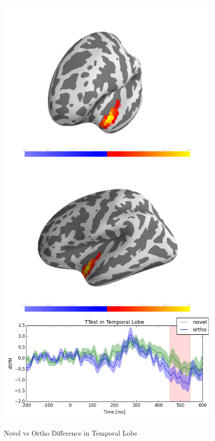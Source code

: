 \documentclass{frontiersSCNS}
\begin{document}
\begin{figure}
\begin{centering}
\includegraphics[scale=0.33]{images/novel_prime_brain_analysis}\includegraphics[scale=0.33]{images/novel_prime_analysis}
\par\end{centering}
\caption{\label{fig:novel_primes} Novel vs Ortho Difference in Temporal Lobe}
\end{figure}
\end{document}
